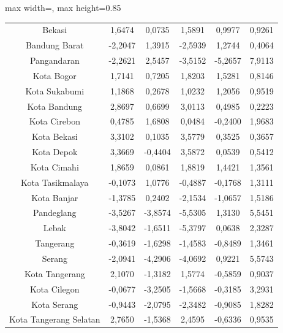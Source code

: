 \begin{table}[H]
\begin{adjustbox}{max width=\textwidth, max height=0.85\textheight}
\begin{tabular}{|c|c|c|c|c|c|}
Bekasi & 1,6474 & 0,0735 & 1,5891 & 0,9977 & 0,9261 \\
Bandung Barat & -2,2047 & 1,3915 & -2,5939 & 1,2744 & 0,4064 \\
Pangandaran & -2,2621 & 2,5457 & -3,5152 & -5,2657 & 7,9113 \\
Kota Bogor & 1,7141 & 0,7205 & 1,8203 & 1,5281 & 0,8146 \\
Kota Sukabumi & 1,1868 & 0,2678 & 1,0232 & 1,2056 & 0,9519 \\
Kota Bandung & 2,8697 & 0,6699 & 3,0113 & 0,4985 & 0,2223 \\
Kota Cirebon & 0,4785 & 1,6808 & 0,0484 & -0,2400 & 1,9683 \\
Kota Bekasi & 3,3102 & 0,1035 & 3,5779 & 0,3525 & 0,3657 \\
Kota Depok & 3,3669 & -0,4404 & 3,5872 & 0,0539 & 0,5412 \\
Kota Cimahi & 1,8659 & 0,0861 & 1,8819 & 1,4421 & 1,3561 \\
Kota Tasikmalaya & -0,1073 & 1,0776 & -0,4887 & -0,1768 & 1,3111 \\
Kota Banjar & -1,3785 & 0,2402 & -2,1534 & -1,0657 & 1,5186 \\
Pandeglang & -3,5267 & -3,8574 & -5,5305 & 1,3130 & 5,5451 \\
Lebak & -3,8042 & -1,6511 & -5,3797 & 0,0638 & 2,3287 \\
Tangerang & -0,3619 & -1,6298 & -1,4583 & -0,8489 & 1,3461 \\
Serang & -2,0941 & -4,2906 & -4,0692 & 0,9221 & 5,5743 \\
Kota Tangerang & 2,1070 & -1,3182 & 1,5774 & -0,5859 & 0,9037 \\
Kota Cilegon & -0,0677 & -3,2505 & -1,5668 & -0,3185 & 3,2931 \\
Kota Serang & -0,9443 & -2,0795 & -2,3482 & -0,9085 & 1,8282 \\
Kota Tangerang Selatan & 2,7650 & -1,5368 & 2,4595 & -0,6336 & 0,9535 \\
\hline
\end{tabular}
\end{adjustbox}
\end{table}